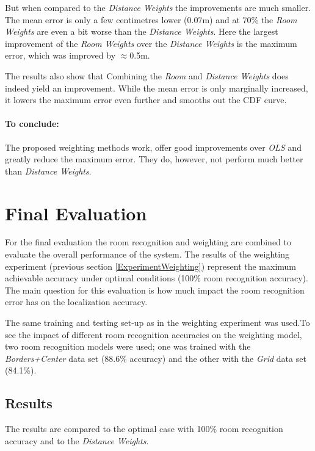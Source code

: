 But when compared to the \emph{Distance Weights} the improvements are much smaller. The mean error is only a few centimetres lower (0.07m) and at 70\% the \emph{Room Weights} are even a bit worse than the \emph{Distance Weights}. Here the largest improvement of the \emph{Room Weights} over the \emph{Distance Weights} is the maximum error, which was improved by $\approx$0.5m.

The results also show that Combining the \emph{Room} and \emph{Distance Weights} does indeed yield an improvement. While the mean error is only marginally increased, it lowers the maximum error even further and smooths out the CDF curve.

\paragraph{To conclude:} 

The proposed weighting methods work, offer good improvements over \emph{OLS} and greatly reduce the maximum error. They do, however, not perform much better than \emph{Distance Weights}.


\section{Final Evaluation}

For the final evaluation the room recognition and weighting are combined to evaluate the overall performance of the system. The results of the weighting experiment (previous section  \ref{ExperimentWeighting}) represent the maximum achievable accuracy under optimal conditions (100\% room recognition accuracy).  The main question for this evaluation is how much impact the room recognition error has on the localization accuracy.

The same training and testing set-up as in the weighting experiment was used.To see the impact of different room recognition accuracies on the weighting model, two room recognition models were used; one was trained with the \emph{Borders+Center} data set (88.6\% accuracy) and the other with the \emph{Grid} data set (84.1\%).

\subsection{Results}

The results are compared to the optimal case with 100\% room recognition accuracy and to the \emph{Distance Weights}.


